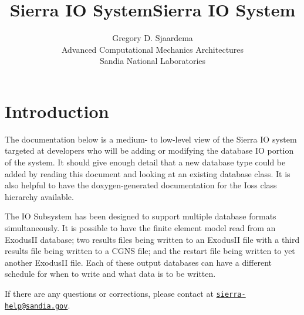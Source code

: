 \documentclass[11pt,twoside]{article}
\title{Sierra IO System}
\begin{document}
\clearpage\pagestyle{Standard}
\title{Sierra IO System}
\author{Gregory D. Sjaardema\\
	Advanced Computational Mechanics Architectures\\
	Sandia National Laboratories}

\maketitle

\setcounter{tocdepth}{3}
\setlength{\parskip}{0ex plus 0.5ex minus 0.2ex}
\tableofcontents

\section{Introduction}
The documentation below is a medium{}- to low{}-level view of the Sierra
IO system targeted at developers who will be adding or modifying the
database IO portion of the system. It should give enough detail that a
new database type could be added by reading this document and looking
at an existing database class. It is also helpful to have the
doxygen{}-generated documentation for the Ioss class hierarchy
available.

The IO Subsystem has been designed to support multiple database formats
simultaneously. It is possible to have the finite element model read
from an ExodusII database; two results files being written to an
ExodusII file with a third results file being written to a CGNS file;
and the restart file being written to yet another ExodusII file. Each of
these output databases can have a different schedule for when to write
and what data is to be written.

If there are any questions or corrections, please contact
at \href{mailto:sierra-help@sandia.gov}{\nolinkurl{sierra-help@sandia.gov}}.

\setlength{\parskip}{1ex plus 0.5ex minus 0.2ex}
\end{document}
